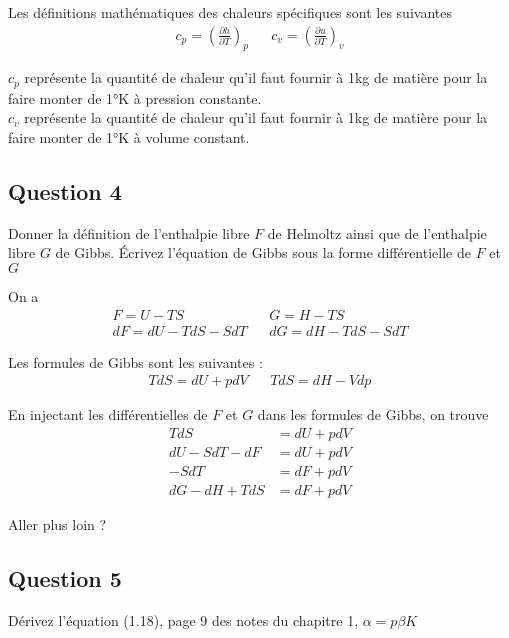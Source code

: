 \begin{tcolorbox}
    Les définitions mathématiques des chaleurs spécifiques sont les suivantes
    \begin{align*}
        c_p = \left(\frac{\partial h}{\partial T}\right)_p & &  c_v = \left(\frac{\partial u}{\partial T}\right)_v
    \end{align*}
    
    $c_p$ représente la quantité de chaleur qu'il faut fournir à 1kg de matière pour la faire monter de 1°K à pression constante.\\
    $c_v$ représente la quantité de chaleur qu'il faut fournir à 1kg de matière pour la faire monter de 1°K à volume constant.
    
\end{tcolorbox}

\subsection*{Question 4}

Donner la définition de l'enthalpie libre $F$ de Helmoltz ainsi que de l'enthalpie libre $G$ de Gibbs. Écrivez l'équation de Gibbs sous la forme différentielle de $F$ et $G$


\begin{tcolorbox}
    On a 
    \begin{align*}
        F = U - TS & & G = H - TS\\
        dF = dU - TdS - SdT & & dG = dH - TdS - SdT
    \end{align*}

    Les formules de Gibbs sont les suivantes : 
    \begin{align*}
        TdS = dU + pdV & & TdS = dH - Vdp
    \end{align*}

    En injectant les différentielles de $F$ et $G$ dans les formules de Gibbs, 
    on trouve
    \begin{align*}
        TdS &=  dU + pdV\\
        dU - SdT - dF &= dU + pdV\\
        -SdT &= dF + pdV \\
        dG - dH + TdS &= dF + pdV
    \end{align*}

    Aller plus loin ? 
\end{tcolorbox}

\subsection*{Question 5}
Dérivez l'équation (1.18), page 9 des notes du chapitre 1, $\alpha = p \beta K$

